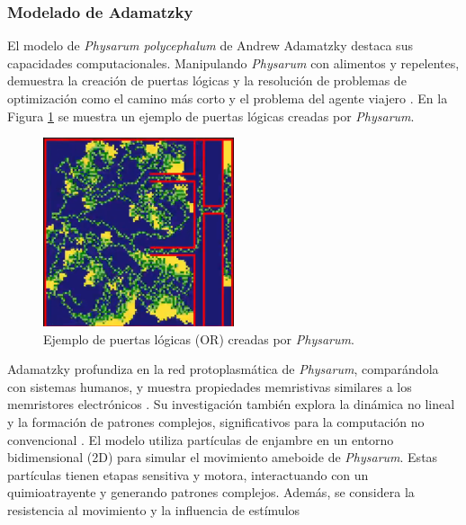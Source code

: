 \subsubsection{Modelado de Adamatzky}

    El modelo de \textit{Physarum polycephalum} de Andrew Adamatzky destaca sus capacidades computacionales. 
        Manipulando \textit{Physarum} con alimentos y repelentes, demuestra la creaci\'on de puertas l\'ogicas y 
        la resoluci\'on de problemas de optimizaci\'on como el camino m\'as corto y el problema del agente viajero \cite{Adamatzky2010}.
        En la Figura \ref{fig:puertas_logicas} se muestra un ejemplo de puertas l\'ogicas creadas por \textit{Physarum}.
    \vskip 0.5cm
    \begin{figure}[h]
        \centering
        \includegraphics[width=0.5\textwidth]{./images/estado_del_arte/physarum/CompuertasLogicas.png}
        \caption{Ejemplo de puertas l\'ogicas (OR) creadas por \textit{Physarum}.}
        \label{fig:puertas_logicas}
    \end{figure}
    \vskip 0.5cm
    Adamatzky profundiza en la red protoplasm\'atica de \textit{Physarum}, compar\'andola con sistemas humanos, y 
        muestra propiedades memristivas similares a los memristores electr\'onicos \cite{Adamatzky2010}. Su investigaci\'on 
        tambi\'en explora la din\'amica no lineal y la formaci\'on de patrones complejos, significativos para la computaci\'on 
        no convencional \cite{Adamatzky2010}.
    \vskip 0.5cm
    El modelo utiliza part\'iculas de enjambre en un entorno bidimensional (2D) para simular el movimiento ameboide de 
        \textit{Physarum}. Estas part\'iculas tienen etapas sensitiva y motora, interactuando con un quimioatrayente 
        y generando patrones complejos. Adem\'as, se considera la resistencia al movimiento y la influencia de est\'imulos 
